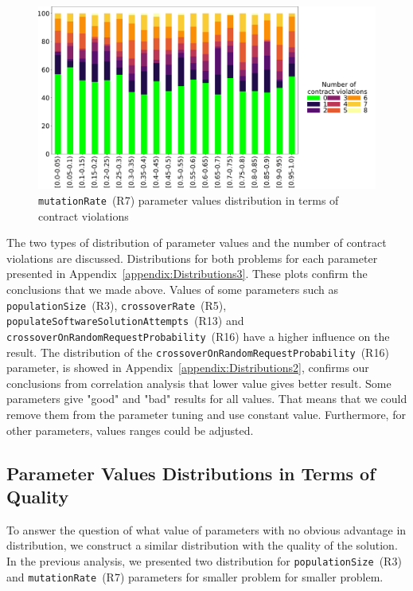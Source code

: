 \begin{figure}
	\centering
	\includegraphics[width=\textwidth]{images/mutationRate_gradient_500dpi.pdf}
	\caption[\texttt{mutationRate}~(R7) parameter values distribution]{\texttt{mutationRate}~(R7) parameter values distribution in terms of contract violations}
	\label{fig:mutationRate_gradient}
\end{figure}

The two types of distribution of parameter values and the number of contract violations are discussed. Distributions for both problems for each parameter presented in Appendix~\ref{appendix:Distributions3}. These plots confirm the conclusions that we made above. Values of some parameters such as \texttt{population\-Size}~(R3), \texttt{crossover\-Rate}~(R5), \texttt{po\-pu\-la\-te\-Soft\-wa\-re\-So\-lu\-tion\-Attempts}~(R13) and \texttt{cross\-over\-On\-Ran\-dom\-Re\-qu\-est\-Pro\-ba\-bi\-li\-ty}~(R16) have a higher influence on the result.
The distribution  of the \texttt{cross\-over\-On\-Ran\-dom\-Re\-quest\-Pro\-ba\-bi\-lity}~(R16) parameter, is showed in Appendix~\ref{appendix:Distributions2}, confirms our conclusions from correlation analysis that lower value gives better result. 
Some parameters give "good" and "bad" results for all values. That means that we could remove them from the parameter tuning and use constant value. Furthermore, for other parameters, values ranges could be adjusted.

\subsection{Parameter Values Distributions in Terms of Quality}
To answer the question of what value of parameters with no obvious advantage in distribution, we construct a similar distribution with the quality of the solution.
In the previous analysis, we presented two distribution for \texttt{populationSize}~(R3) and \texttt{mutationRate}~(R7) parameters for smaller problem for smaller problem.

